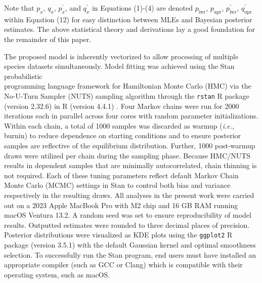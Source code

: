 \documentclass[12pt]{article}
\begin{document}
\noindent Note that $p_x$, $q_x$, $p^{'}_x$, and $q^{'}_x$ in Equations (1)-(4) are denoted $p_\mathrm{lwr}$, $p_\mathrm{upr}$, $p^{'}_\mathrm{lwr}$, $q^{'}_\mathrm{upr}$ within Equation (12) for easy distinction between MLEs and Bayesian posterior estimates. The above statistical theory and derivations lay a good foundation for the remainder of this paper.

The proposed model is inherently vectorized to allow processing of multiple species datasets simultaneously. Model fitting was achieved using the Stan probabilistic \\ programming language \citep{carpenter2017stan} framework for Hamiltonian Monte Carlo (HMC) via the No-U-Turn Sampler (NUTS) sampling algorithm \citep{hoffman2014no} through the {\tt rstan} R package (version 2.32.6) \citep{stan2023rstan} in R (version 4.4.1) \citep{rcore2024language}. Four Markov chains were run for 2000 iterations each in parallel across four cores with random parameter initializations. Within each chain, a total of 1000 samples was discarded as warmup (\textit{i.e.}, burnin) to reduce dependence on starting conditions and to ensure posterior samples are reflective of the equilibrium distribution. Further, 1000 post-warmup draws were utilized per chain during the sampling phase. Because HMC/NUTS results in dependent samples that are minimally autocorrelated, chain thinning is not required. Each of these tuning parameters reflect default Markov Chain Monte Carlo (MCMC) settings in Stan to control both bias and variance respectively in the resulting draws. All analyses in the present work were carried out on a 2023 Apple MacBook Pro with M2 chip and 16 GB RAM running macOS Ventura 13.2. A random seed was set to ensure reproducibility of model results. Outputted estimates were rounded to three decimal places of precision. Posterior distributions were visualized as KDE plots using the {\tt ggplot2} R package (version 3.5.1) \citep{wickham2016ggplot2} with the default Gaussian kernel and optimal smoothness selection. To successfully run the Stan program, end users must have installed an appropriate compiler (such as GCC or Clang) which is compatible with their operating system, such as macOS.
\end{document}
